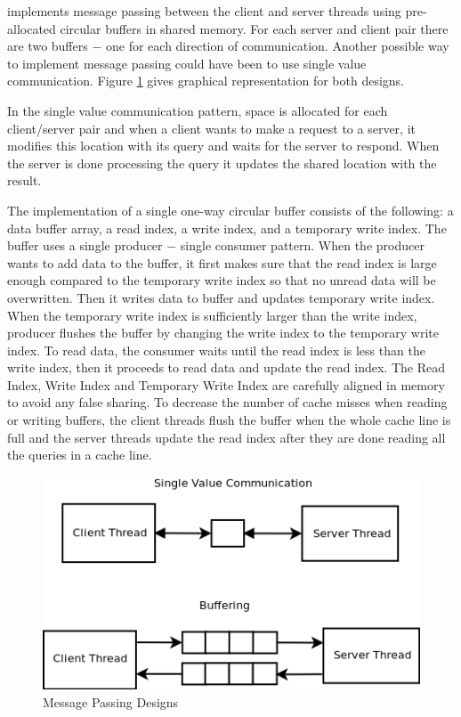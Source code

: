 \cphash{} implements message passing between the client and server threads using pre-allocated circular buffers in shared memory. 
For each server and client pair there are two buffers $-$ one for each direction of communication. Another possible way to 
implement message passing could have been to use single value communication. Figure \ref{fig:mpdesign} gives graphical representation for both designs.

In the single value communication pattern, space is allocated for each client/server pair and when a client wants to make 
a request to a server, it modifies this location with its query and waits for the server to respond. When the server is done processing the query it 
updates the shared location with the result. 

The implementation of a single one-way circular buffer consists of the following: a data buffer array, a read index, 
a write index, and a temporary write index. The buffer uses a single producer $-$ single consumer pattern. When the producer wants to add 
data to the buffer, it first makes sure that the read index is large enough compared to the temporary write index so that no 
unread data will be overwritten. Then it writes data to buffer and updates temporary write index. When the temporary write 
index is sufficiently larger than the write index, producer flushes the buffer by changing the write index to the temporary write index. 
To read data, the consumer waits until the read index is less than the write index, then it proceeds to read data and update the read 
index. The Read Index, Write Index and Temporary Write Index are carefully aligned in memory to avoid any false sharing. 
To decrease the number of cache misses when reading or writing buffers, the client threads flush the buffer when the whole cache line is 
full and the server threads update the read index after they are done reading all the queries in a cache line.

\begin{figure}[!ht]
  \centering
  \includegraphics[width=0.8\linewidth]{figs/mpdesign.png}
  \caption{Message Passing Designs}
  \label{fig:mpdesign}
\end{figure}

